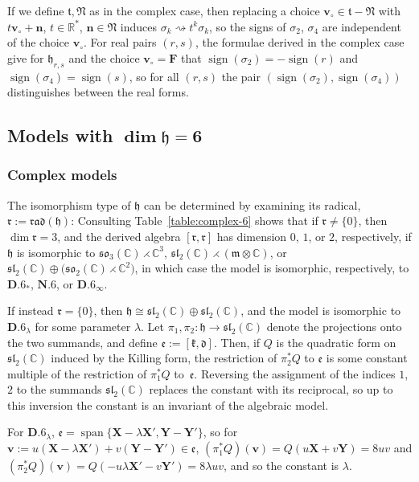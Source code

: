 \documentclass[pdftex]{sigma}
\DeclareMathOperator{\sign}{sign}
\DeclareMathOperator{\spanOperator}{span}
\newcommand{\Span}[1]{\spanOperator\{{#1}\}}
\newcommand{\bbC}{\mathbb{C}}
\newcommand{\bbR}{\mathbb{R}}
\newcommand{\mbF}{\mathbf{F}}
\newcommand{\mbv}{\mathbf{v}}
\newcommand{\mbX}{\mathbf{X}}
\newcommand{\mbY}{\mathbf{Y}}
\newcommand{\mfd} {\mathfrak{d}}
\newcommand{\mfe} {\mathfrak{e}}
\newcommand{\mfh} {\mathfrak{h}}
\newcommand{\mfk} {\mathfrak{k}}
\newcommand{\mfm} {\mathfrak{m}}
\newcommand{\mfN} {\mathfrak{N}}
\newcommand{\mfr} {\mathfrak{r}}
\newcommand{\mft} {\mathfrak{t}}
\newcommand{\mfrad}{\mathfrak{rad}}
\newcommand{\mfsl} {\mathfrak{sl}}
\newcommand{\mfso} {\mathfrak{so}}
\numberwithin{equation}{section}
\begin{document}
If we define $\mft, \mfN$ as in the complex case, then replacing a choice $\mbv_{\circ} \in \mft - \mfN$ with $t \mbv_{\circ} + \mathbf{n}$, $t \in \bbR^*$, $\mathbf{n} \in \mfN$ induces $\sigma_k \rightsquigarrow t^k \sigma_k$, so the signs of $\sigma_2$, $\sigma_4$ are independent of the choice $\mbv_{\circ}$. For real pairs $(r, s)$, the formulae derived in the complex case give for $\mfh_{r, s}$ and the choice $\mbv_{\circ} = \mbF$ that $\sign(\sigma_2) = -\sign(r)$ and $\sign(\sigma_4) = \sign(s)$, so for all $(r, s)$ the pair $(\sign(\sigma_2), \sign(\sigma_4))$ distinguishes between the real forms.

\subsection[Models with $\dim \mfh = 6$]{Models with $\boldsymbol{\dim \mfh = 6}$}\label{subsection:identification-6}

\subsubsection{Complex models}\label{subsubsection:identification-6-complex} The isomorphism type of $\mfh$ can be determined by examining its radical, $\mfr := \mfrad(\mfh)$: Consulting Table~\ref{table:complex-6} shows that if $\mfr \neq \{ 0 \}$, then $\dim \mfr = 3$, and the derived algebra $[\mfr, \mfr]$ has dimension $0$, $1$, or $2$, respectively, if $\mfh$ is isomorphic to $\mfso_3(\bbC) \rightthreetimes \bbC^3$, $\mfsl_2(\bbC) \rightthreetimes (\mfm \otimes \bbC)$, or $\mfsl_2(\bbC) \oplus \big(\mfso_2(\bbC) \rightthreetimes \bbC^2\big)$, in which case the model is isomorphic, respectively, to $\mathbf{D.6}_{\ast}$, $\mathbf{N.6}$, or $\mathbf{D.6}_{\infty}$.

If instead $\mfr = \{ 0 \}$, then $\mfh \cong \mfsl_2(\bbC) \oplus \mfsl_2(\bbC)$, and the model is isomorphic to $\mathbf{D.6}_{\lambda}$ for some parameter $\lambda$. Let $\pi_1, \pi_2 \colon \mfh \to \mfsl_2(\bbC)$ denote the projections onto the two summands, and define $\mfe := [\mfk, \mfd]$. Then, if $Q$ is the quadratic form on $\mfsl_2(\bbC)$ induced by the Killing form, the restriction of $\pi_2^* Q$ to $\mfe$ is some constant multiple of the restriction of $\pi_1^* Q$ to~$\mfe$. Reversing the assignment of the indices $1$, $2$ to the summands $\mfsl_2(\bbC)$ replaces the constant with its reciprocal, so up to this inversion the constant is an invariant of the algebraic model.

For $\mathbf{D.6}_{\lambda}$, $\mfe = \Span{\mbX - \lambda \mbX', \mbY - \mbY'}$, so for $\mbv := u(\mbX -\lambda \mbX') + v (\mbY - \mbY') \in \mfe$, $(\pi_1^* Q)(\mbv) = Q(u \mbX + v \mbY) = 8 u v$ and $(\pi_2^* Q)(\mbv) = Q(-u \lambda \mbX' - v \mbY') = 8 \lambda u v$, and so the constant is $\lambda$.
\end{document}
